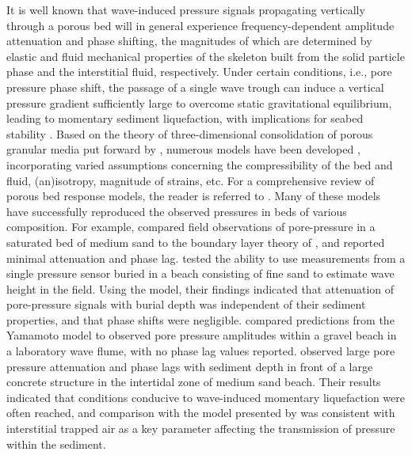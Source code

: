 It is well known \citep[e.g.,][]{Yamamoto_etal1978} that wave-induced pressure signals propagating vertically through a porous bed will in general experience frequency-dependent amplitude attenuation and phase shifting, the magnitudes of which are determined by elastic and fluid mechanical properties of the skeleton built from the solid particle phase and the interstitial fluid, respectively. Under certain conditions, i.e., pore pressure phase shift, the passage of a single wave trough can induce a vertical pressure gradient sufficiently large to overcome static gravitational equilibrium, leading to momentary sediment liquefaction, with implications for seabed stability \citep[e.g.,][]{Sakai_etal1992, Bonjean_etal2004, Mory_etal2007}. Based on the theory of three-dimensional consolidation of porous granular media put forward by \citet{Biot1941}, numerous models have been developed \citep[][and many more]{Putnam1949, Sleath1970, Massel1976, Madsen1978, Yamamoto_etal1978, Mei_Foda1981, Okusa1985}, incorporating varied assumptions concerning the compressibility of the bed and fluid, (an)isotropy, magnitude of strains, etc. For a comprehensive review of porous bed response models, the reader is referred to \citet{Jeng2003}. Many of these models have successfully reproduced the observed pressures in beds of various composition. For example, \citet{Sakai_etal1993} compared field observations of pore-pressure in a saturated bed of medium sand to the boundary layer theory of \citet{Mei_Foda1981}, and reported minimal attenuation and phase lag. \citet{Raubenheimer_etal1998} tested the ability to use measurements from a single pressure sensor buried in a beach consisting of fine sand to estimate wave height in the field. Using the \citet{Yamamoto_etal1978} model, their findings indicated that attenuation of pore-pressure signals with burial depth was independent of their sediment properties, and that phase shifts were negligible. \citet{PedrozoAcuna_etal2008} compared predictions from the Yamamoto model to observed pore pressure amplitudes within a gravel beach in a laboratory wave flume, with no phase lag values reported. \citet{Michallet_etal2009} observed large pore pressure attenuation and phase lags with sediment depth in front of a large concrete structure in the intertidal zone of medium sand beach. Their results indicated that conditions conducive to wave-induced momentary liquefaction were often reached, and comparison with the model presented by \citet{Sakai_etal1992} was consistent with interstitial trapped air as a key parameter affecting the transmission of pressure within the sediment.

